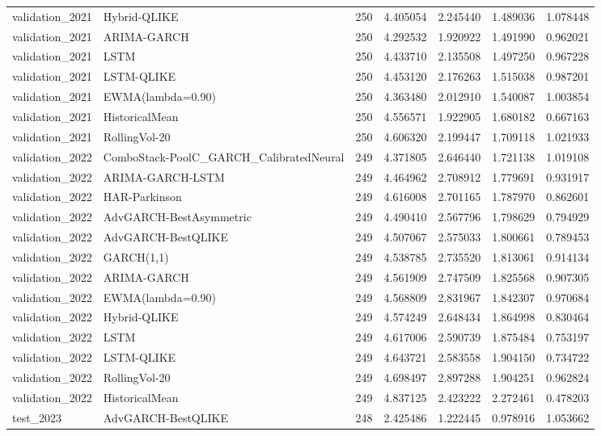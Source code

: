 \begin{tabular}{l l r r r r r}
validation\_2021 & Hybrid-QLIKE & 250 & 4.405054 & 2.245440 & 1.489036 & 1.078448 \\
validation\_2021 & ARIMA-GARCH & 250 & 4.292532 & 1.920922 & 1.491990 & 0.962021 \\
validation\_2021 & LSTM & 250 & 4.433710 & 2.135508 & 1.497250 & 0.967228 \\
validation\_2021 & LSTM-QLIKE & 250 & 4.453120 & 2.176263 & 1.515038 & 0.987201 \\
validation\_2021 & EWMA(lambda=0.90) & 250 & 4.363480 & 2.012910 & 1.540087 & 1.003854 \\
validation\_2021 & HistoricalMean & 250 & 4.556571 & 1.922905 & 1.680182 & 0.667163 \\
validation\_2021 & RollingVol-20 & 250 & 4.606320 & 2.199447 & 1.709118 & 1.021933 \\
validation\_2022 & ComboStack-PoolC\_GARCH\_CalibratedNeural & 249 & 4.371805 & 2.646440 & 1.721138 & 1.019108 \\
validation\_2022 & ARIMA-GARCH-LSTM & 249 & 4.464962 & 2.708912 & 1.779691 & 0.931917 \\
validation\_2022 & HAR-Parkinson & 249 & 4.616008 & 2.701165 & 1.787970 & 0.862601 \\
validation\_2022 & AdvGARCH-BestAsymmetric & 249 & 4.490410 & 2.567796 & 1.798629 & 0.794929 \\
validation\_2022 & AdvGARCH-BestQLIKE & 249 & 4.507067 & 2.575033 & 1.800661 & 0.789453 \\
validation\_2022 & GARCH(1,1) & 249 & 4.538785 & 2.735520 & 1.813061 & 0.914134 \\
validation\_2022 & ARIMA-GARCH & 249 & 4.561909 & 2.747509 & 1.825568 & 0.907305 \\
validation\_2022 & EWMA(lambda=0.90) & 249 & 4.568809 & 2.831967 & 1.842307 & 0.970684 \\
validation\_2022 & Hybrid-QLIKE & 249 & 4.574249 & 2.648434 & 1.864998 & 0.830464 \\
validation\_2022 & LSTM & 249 & 4.617006 & 2.590739 & 1.875484 & 0.753197 \\
validation\_2022 & LSTM-QLIKE & 249 & 4.643721 & 2.583558 & 1.904150 & 0.734722 \\
validation\_2022 & RollingVol-20 & 249 & 4.698497 & 2.897288 & 1.904251 & 0.962824 \\
validation\_2022 & HistoricalMean & 249 & 4.837125 & 2.423222 & 2.272461 & 0.478203 \\
test\_2023 & AdvGARCH-BestQLIKE & 248 & 2.425486 & 1.222445 & 0.978916 & 1.053662 \\

\end{tabular}
